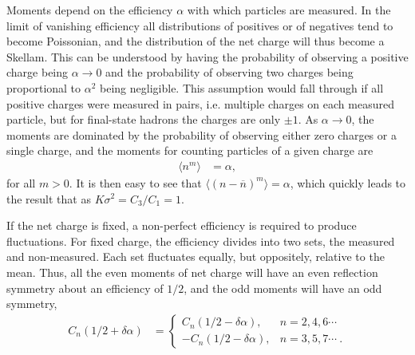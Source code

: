 Moments depend on the efficiency $\alpha$ with which particles are measured. In the limit of vanishing efficiency all distributions of positives or of negatives tend to become Poissonian, and the distribution of the net charge will thus become a Skellam.  This can be understood by having the probability of observing a positive charge being $\alpha\rightarrow 0$ and the probability of observing two charges being proportional to $\alpha^2$ being negligible. This assumption would fall through if all positive charges were measured in pairs, i.e. multiple charges on each measured particle, but for final-state hadrons the charges are only $\pm 1$. As $\alpha\rightarrow 0$, the moments are dominated by the probability of observing either zero charges or a single charge, and the moments for counting particles of a given charge are
\begin{eqnarray}
\langle n^m\rangle&=\alpha,
\end{eqnarray}
for all $m>0$. It is then easy to see that $\langle (n-\overline{n})^m\rangle=\alpha$, which quickly leads to the result that as $K\sigma^2=C_3/C_1=1$.

If the net charge is fixed, a non-perfect efficiency is required to produce fluctuations. For fixed charge, the efficiency divides into two sets, the measured and non-measured. Each set fluctuates equally, but oppositely, relative to the mean. Thus, all the even moments of net charge will have an even reflection symmetry about an efficiency of $1/2$, and the odd moments will have an odd symmetry,
\begin{eqnarray}
\label{eq:alphasymm}
C_n(1/2+\delta\alpha)&=\left\{\begin{array}{rl}
C_n(1/2-\delta\alpha),&n=2,4,6\cdots\\
-C_n(1/2-\delta\alpha),&n=3,5,7\cdots~.\end{array}\right.
\end{eqnarray}
